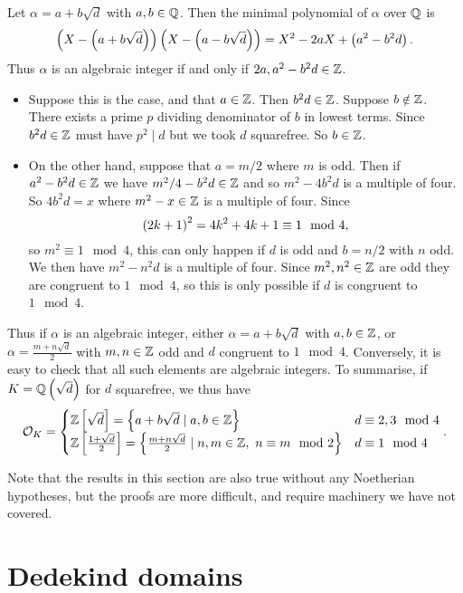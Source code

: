 Let $ \alpha = a + b\sqrt{d} $ with $ a, b \in \mathbb{Q} $. Then the minimal polynomial of $ \alpha $ over $ \mathbb{Q} $ is
$$ \left( X - \left( a + b\sqrt{d} \right) \right)\left( X - \left( a - b\sqrt{d} \right) \right) = X^2 - 2aX + \left( a^2 - b^2d \right). $$
Thus $ \alpha $ is an algebraic integer if and only if $ 2a, a^2 - b^2d \in \mathbb{Z} $.
\begin{itemize}
\item Suppose this is the case, and that $ a \in \mathbb{Z} $. Then $ b^2d \in \mathbb{Z} $. Suppose $ b \notin \mathbb{Z} $. There exists a prime $ p $ dividing denominator of $ b $ in lowest terms. Since $ b^2d \in \mathbb{Z} $ must have $ p^2 \mid d $ but we took $ d $ squarefree. So $ b \in \mathbb{Z} $.
\item On the other hand, suppose that $ a = m / 2 $ where $ m $ is odd. Then if $ a^2 - b^2d \in \mathbb{Z} $ we have $ m^2 / 4 - b^2d \in \mathbb{Z} $ and so $ m^2 - 4b^2d $ is a multiple of four. So $ 4b^2d = x $ where $ m^2 - x \in \mathbb{Z} $ is a multiple of four. Since
$$ \left( 2k + 1 \right)^2 = 4k^2 + 4k + 1 \equiv 1 \mod 4, $$
so $ m^2 \equiv 1 \mod 4 $, this can only happen if $ d $ is odd and $ b = n / 2 $ with $ n $ odd. We then have $ m^2 - n^2d $ is a multiple of four. Since $ m^2, n^2 \in \mathbb{Z} $ are odd they are congruent to $ 1 \mod 4 $, so this is only possible if $ d $ is congruent to $ 1 \mod 4 $.
\end{itemize}
Thus if $ \alpha $ is an algebraic integer, either $ \alpha = a + b\sqrt{d} $ with $ a, b \in \mathbb{Z} $, or $ \alpha = \tfrac{m + n\sqrt{d}}{2} $ with $ m, n \in \mathbb{Z} $ odd and $ d $ congruent to $ 1 \mod 4 $. Conversely, it is easy to check that all such elements are algebraic integers. To summarise, if $ K = \mathbb{Q}\left( \sqrt{d} \right) $ for $ d $ squarefree, we thus have
$$ \mathcal{O}_K = \begin{cases}
\mathbb{Z}\left[ \sqrt{d} \right] = \left\{ a + b\sqrt{d} \mid a, b \in \mathbb{Z} \right\} & d \equiv 2, 3 \mod 4 \\
\mathbb{Z}\left[ \tfrac{1 + \sqrt{d}}{2} \right] = \left\{ \tfrac{m + n\sqrt{d}}{2} \mid n, m \in \mathbb{Z}, \ n \equiv m \mod 2 \right\} & d \equiv 1 \mod 4
\end{cases}. $$

Note that the results in this section are also true without any Noetherian hypotheses, but the proofs are more difficult, and require machinery we have not covered.

\pagebreak


\section{Dedekind domains}

